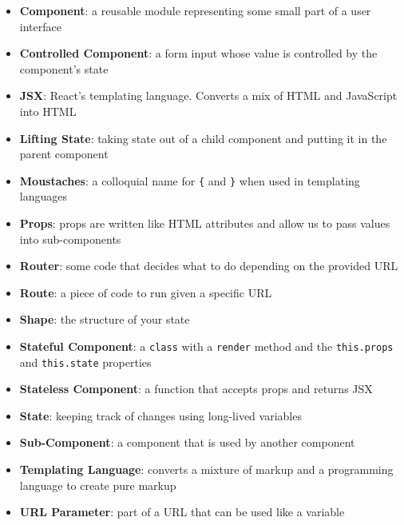 \begin{itemize}[leftmargin=*]
    \item
        \textbf{Component}:
        a reusable module representing some small part of a user interface
    \item
        \textbf{Controlled Component}:
        a form input whose value is controlled by the component's state
    \item
        \textbf{JSX}:
        React's templating language. Converts a mix of HTML and JavaScript into HTML
    \item
        \textbf{Lifting State}:
        taking state out of a child component and putting it in the parent component
    \item
        \textbf{Moustaches}:
        a colloquial name for \texttt{\{} and \texttt{\}} when used in templating languages
    \item
        \textbf{Props}:
        props are written like HTML attributes and allow us to pass values into sub-components
    \item
        \textbf{Router}:
        some code that decides what to do depending on the provided URL
    \item
        \textbf{Route}:
        a piece of code to run given a specific URL
    \item
        \textbf{Shape}:
        the structure of your state
    \item
        \textbf{Stateful Component}:
        a \texttt{class} with a \texttt{render} method and the \texttt{this.props} and \texttt{this.state} properties
    \item
        \textbf{Stateless Component}:
        a function that accepts props and returns JSX
    \item
        \textbf{State}:
        keeping track of changes using long-lived variables
    \item
        \textbf{Sub-Component}:
        a component that is used by another component
    \item
        \textbf{Templating Language}:
        converts a mixture of markup and a programming language to create pure markup
    \item
        \textbf{URL Parameter}:
        part of a URL that can be used like a variable
\end{itemize}
